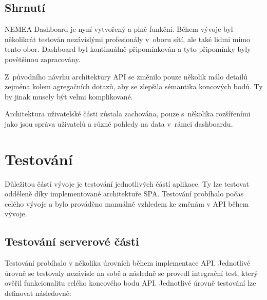 \section{Shrnutí}

NEMEA Dashboard je nyní vytvořený a plně funkční. Během vývoje byl několikrát testován nezávislými profesionály v~oboru sítí, ale také lidmi mimo tento obor. Dashboard byl kontinuálně připomínkován a tyto připomínky byly povětšinou zapracovány.

Z~původního návrhu architektury API se změnilo pouze několik málo detailů zejména kolem agregačních dotazů, aby se zlepšila sémantika koncových bodů. Ty by jinak musely být velmi komplikované.

Architektura uživatelské části zůstala zachována, pouze s~několika rozšířeními jako jsou správa uživatelů a různé pohledy na data v~rámci dashboardu.

\chapter{Testování}

Důležitou částí vývoje je testování jednotlivých částí aplikace. Ty lze testovat odděleně díky implementované architektuře SPA. Testování probíhalo počas celého vývoje a bylo prováděno manuálně vzhledem ke změnám v API během vývoje.

\section{Testování serverové části}

Testování probíhalo v několika úrovních během implementace API. Jednotlivé úrovně se testovaly nezávisle na sobě a následně se provedl integrační test, který ověřil funkcionalitu celého koncového bodu API. Jednotlivé úrovně testování lze definovat následovně:

